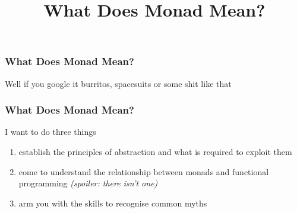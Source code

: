 {


  \begin{frame}[plain] 
  \title{What Does Monad Mean?}
  
  \vspace{3em}

  \begin{TitleBoxWhatDoesMonadMean}
    \begin{center}
    {\Large \inserttitle}
    \end{center}
  \end{TitleBoxWhatDoesMonadMean}

  \end{frame}
}


\begin{frame}
\frametitle{What Does Monad Mean?}
\begin{block}{Well if you google it}
burritos, spacesuits or some shit like that
\end{block}
\end{frame}


\begin{frame}
\frametitle{What Does Monad Mean?}
\begin{block}{I want to do three things}
\begin{enumerate}
  \item establish the principles of abstraction and what is required to exploit them
  \item come to understand the relationship between monads and functional programming \emph{\tiny{(spoiler: there isn't one)}} \normalsize
  \item arm you with the skills to recognise common myths
\end{enumerate}
\end{block}
\end{frame}


